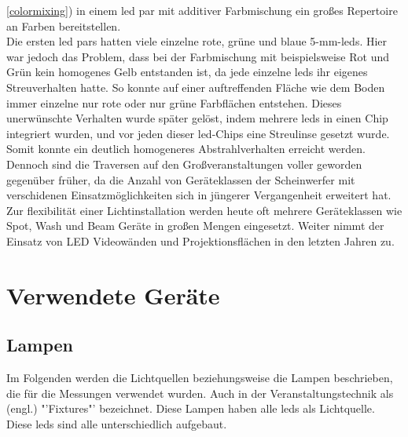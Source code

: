 \documentclass[11pt]{scrartcl}
\begin{document}
\ref{colormixing}) in einem \ac{led} \ac{par} mit additiver Farbmischung ein großes Repertoire an Farben bereitstellen.\\
Die ersten \ac{led} \ac{par}s hatten viele einzelne rote, grüne und blaue 5-mm-\ac{led}s. Hier war jedoch das Problem, dass bei der Farbmischung
mit beispielsweise Rot und Grün kein homogenes Gelb entstanden ist, da jede einzelne \ac{led}s ihr eigenes Streuverhalten hatte. So konnte
auf einer auftreffenden Fläche wie dem Boden immer einzelne nur rote oder nur grüne Farbflächen entstehen. Dieses unerwünschte Verhalten wurde
später gelöst, indem mehrere \ac{led}s in einen Chip integriert wurden, und vor jeden dieser \ac{led}-Chips eine Streulinse gesetzt wurde.
Somit konnte ein deutlich homogeneres Abstrahlverhalten erreicht werden.\\
Dennoch sind die Traversen auf den Großveranstaltungen voller geworden gegenüber früher, da die Anzahl von Geräteklassen der Scheinwerfer mit verschidenen
Einsatzmöglichkeiten sich in jüngerer Vergangenheit erweitert hat. Zur flexibilität einer Lichtinstallation werden heute oft mehrere Geräteklassen wie Spot,
Wash und Beam Geräte in großen Mengen eingesetzt. Weiter nimmt der Einsatz von LED Videowänden und Projektionsflächen in den letzten Jahren zu.
\clearpage

\section{Verwendete Geräte}
\subsection{Lampen}\label{lamps}
Im Folgenden werden die Lichtquellen beziehungsweise die Lampen beschrieben, die für die Messungen verwendet wurden.
Auch in der Veranstaltungstechnik als (engl.) "'Fixtures"' bezeichnet. Diese Lampen haben alle \ac{led}s als Lichtquelle. Diese \ac{led}s
sind alle unterschiedlich aufgebaut.
\end{document}
